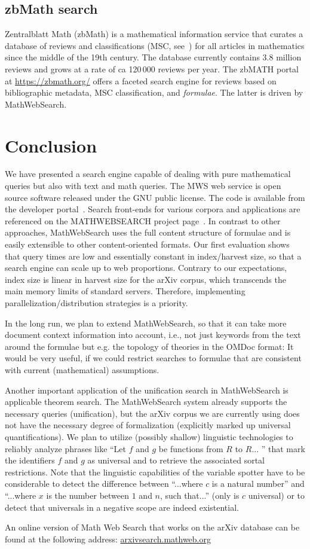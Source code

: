 \documentclass{deliverablereport}
\begin{document}
\subsection{zbMath search}

Zentralblatt Math (zbMath) is a mathematical information service that curates a database
of reviews and classifications (MSC, see~\cite{MSC2010}) for all articles in mathematics
since the middle of the 19th century. The database currently contains 3.8 million reviews
and grows at a rate of ca 120\,000 reviews per year. The zbMATH portal at
\url{https://zbmath.org/} offers a faceted search engine for reviews based on
bibliographic metadata, MSC classification, and \emph{formulae}. The latter is driven by
MathWebSearch.

\section{Conclusion}\label{sec:concl}
We have presented a search engine capable of dealing with pure mathematical queries but
also with text and math queries. The MWS web service is open source software released
under the GNU public license. The code is available from the developer
portal~\cite{MWS-git:on}. Search front-ends for various corpora and applications are
referenced on the MATHWEBSEARCH project page~\cite{MWSProj:on}. In contrast to other
approaches, MathWebSearch uses the full content structure of formulae and is easily
extensible to other content-oriented formats. Our first evaluation shows that query times
are low and essentially constant in index/harvest size, so that a search engine can scale
up to web proportions. Contrary to our expectations, index size is linear in harvest size
for the arXiv corpus, which transcends the main memory limits of standard
servers. Therefore, implementing parallelization/distribution strategies is a
priority. 

In the long run, we plan to extend MathWebSearch, so that it can take more document
context information into account, i.e., not just keywords from the text around the
formulae but e.g. the topology of theories in the OMDoc format: It would be very useful,
if we could restrict searches to formulae that are consistent with current (mathematical)
assumptions. 

Another important application of the unification search in MathWebSearch is applicable
theorem search. The MathWebSearch system already supports the necessary queries
(unification), but the arXiv corpus we are currently using does not have the necessary
degree of formalization (explicitly marked up universal quantifications). We plan to
utilize (possibly shallow) linguistic technologies to reliably analyze phrases like “Let
$f$ and $g$ be functions from $R$ to $R$... ” that mark the identifiers $f$ and $g$ as
universal and to retrieve the associated sortal restrictions. Note that the linguistic
capabilities of the variable spotter have to be considerable to detect the difference
between “...where $c$ is a natural number” and “...where $x$ is the number between $1$ and
$n$, such that...” (only is $c$ universal) or to detect that universals in a negative
scope are indeed existential.

An online version of Math Web Search that works on the arXiv database can be found at the
following address: \url{arxivsearch.mathweb.org}

\printbibliography
\end{document}
